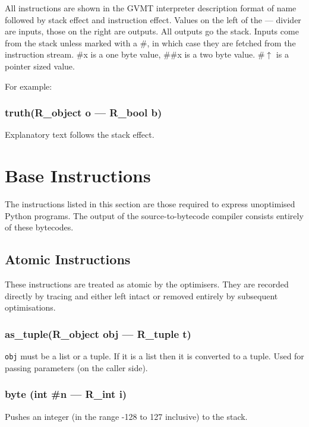 
        All instructions are shown in the GVMT interpreter description format of
        name followed by stack effect and instruction effect. 
        Values on the left of the --- divider are inputs, those on the right are 
        outputs. All outputs go the stack. Inputs come from the stack unless 
        marked with a \#, in which case they are fetched from the instruction
        stream. \#x is a one byte value, \#\#x is a two byte value. \#$\uparrow$ is a
        pointer sized value.
        
    For example: \vspace{-1em}
        \subsubsection{truth(R\_object o  --- R\_bool b)}\vspace{-1em}
        Explanatory text follows the stack effect.
        
        
        
\section{Base Instructions}

    The instructions listed in this section are those required to express 
    unoptimised Python programs. The output of the source-to-bytecode compiler
    consists entirely of these bytecodes.
\subsection{Atomic Instructions}

    These instructions are treated as atomic by the optimisers. 
    They are recorded directly by tracing and either left intact or 
    removed entirely by subsequent optimisations.
\subsubsection{as\_tuple(R\_object obj --- R\_tuple t)}
\vspace{-1em}\texttt{obj} must be a list or a tuple.  If it is a list then it is converted to a tuple. Used for passing parameters (on the caller side). \vspace{-1em}
\subsubsection{byte (int \#n --- R\_int i)}
\vspace{-1em}Pushes an integer (in the range -128 to 127 inclusive) to the stack. \vspace{-1em}
